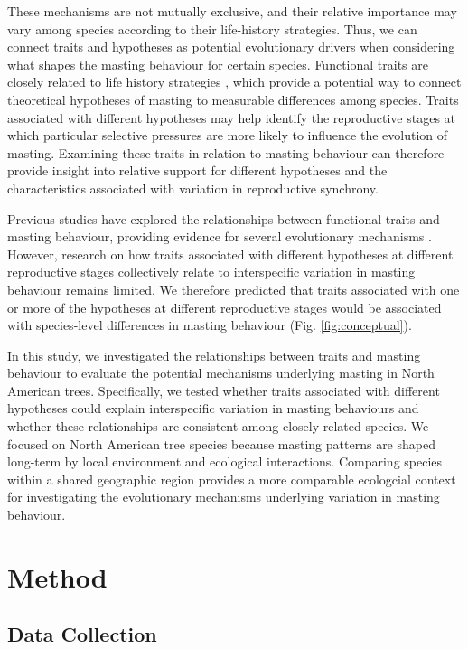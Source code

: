 \documentclass{article}
\begin{document}
These mechanisms are not mutually exclusive, and their relative importance may vary among species according to their life-history strategies. Thus, we can connect traits and hypotheses as potential evolutionary drivers when considering what shapes the masting behaviour for certain species. Functional traits are closely related to life history strategies \citep{adler2014functional}, which provide a potential way to connect theoretical hypotheses of masting to measurable differences among species. Traits associated with different hypotheses may help identify the reproductive stages at which particular selective pressures are more likely to influence the evolution of masting. Examining these traits in relation to masting behaviour can therefore provide insight into relative support for different hypotheses and the characteristics associated with variation in reproductive synchrony.

Previous studies have explored the relationships between functional traits and masting behaviour, providing evidence for several evolutionary mechanisms \citep{journe2023evolution, satake2021studying, pearse2020biogeography, qiu2023masting}. However, research on how traits associated with different hypotheses at different reproductive stages collectively relate to interspecific variation in masting behaviour remains limited. We therefore predicted that traits associated with one or more of the hypotheses at different reproductive stages would be associated with species-level differences in masting behaviour (Fig. \ref{fig:conceptual}).

In this study, we investigated the relationships between traits and masting behaviour to evaluate the potential mechanisms underlying masting in North American trees. Specifically, we tested whether traits associated with different hypotheses could explain interspecific variation in masting behaviours and whether these relationships are consistent among closely related species. We focused on North American tree species because masting patterns are shaped long-term by local environment and ecological interactions. Comparing species within a shared geographic region provides a more comparable ecologcial context for investigating the evolutionary mechanisms underlying variation in masting behaviour.

\section{Method} 
\subsection{Data Collection}
\end{document}

